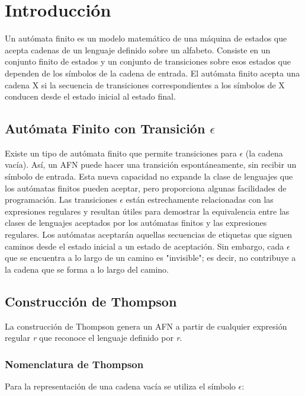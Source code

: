 \section{Introducción}

Un autómata finito es un modelo matemático de una máquina de estados que acepta cadenas de un lenguaje definido sobre un alfabeto. Consiste en un conjunto finito de estados y un conjunto de transiciones sobre esos estados que dependen de los símbolos de la cadena de entrada. El autómata finito acepta una cadena X si la secuencia de transiciones correspondientes a los símbolos de X conducen desde el estado inicial al estado final.

\subsection{Autómata Finito con Transición $\epsilon$}

Existe un tipo de autómata finito que permite transiciones para $\epsilon$ (la cadena vacía). Así, un AFN puede hacer una transición espontáneamente, sin recibir un símbolo de entrada. Esta nueva capacidad no expande la clase de lenguajes que los autómatas finitos pueden aceptar, pero proporciona algunas facilidades de programación. Las transiciones $\epsilon$ están estrechamente relacionadas con las expresiones regulares y resultan útiles para demostrar la equivalencia entre las clases de lenguajes aceptados por los autómatas finitos y las expresiones regulares. Los autómatas aceptarán aquellas secuencias de etiquetas que siguen caminos desde el estado inicial a un estado de aceptación. Sin embargo, cada $\epsilon$ que se encuentra a lo largo de un camino es "invisible"; es decir, no contribuye a la cadena que se forma a lo largo del camino.

\subsection{Construcción de Thompson}

La construcción de Thompson genera un AFN a partir de cualquier expresión regular \textit{r} que reconoce el lenguaje definido por \textit{r}.

\subsubsection{Nomenclatura de Thompson}

Para la representación de una cadena vacía se utiliza el símbolo $\epsilon$:

